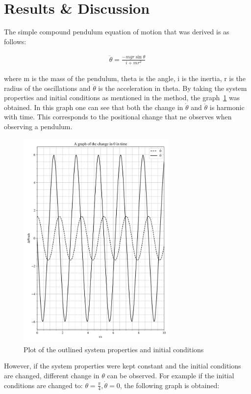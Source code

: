 \documentclass[12pt, a4paper]{article}
\begin{document}
\section{Results \& Discussion}
The simple compound pendulum equation of motion that was derived is as follows:

\begin{align}
    \ddot{\theta} = \frac{-mgr\sin \theta}{i+mr^2}
\end{align}

where m is the mass of the pendulum, theta is the angle, i is the inertia, r is the radius of the oscillations and \(\ddot{\theta}\) is the acceleration in theta. By taking the system properties and initial conditions as mentioned in the method, the graph~\ref{fig: pendulum 1.1} was obtained. In this graph one can see that both the change in \(\dot{\theta}\) and \(\ddot{\theta}\) is harmonic with time. This corresponds to the positional change that ne observes when observing a pendulum.

\begin{figure}[H]
    \centering
    \includegraphics[width = 0.7\textwidth]{plots/Plot 1.1.png}\caption{Plot of the outlined system properties and initial conditions}\label{fig: pendulum 1.1}
\end{figure}

However, if the system properties were kept constant and the initial conditions are changed, different change in \(\theta\) can be observed. For example if the initial conditions are changed to: \(\theta = \frac{\pi}{4}, \dot{\theta} = 0\), the following graph is obtained:
\end{document}
